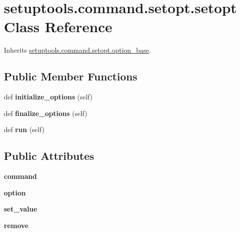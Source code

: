 \hypertarget{classsetuptools_1_1command_1_1setopt_1_1setopt}{}\section{setuptools.\+command.\+setopt.\+setopt Class Reference}
\label{classsetuptools_1_1command_1_1setopt_1_1setopt}


Inherits \hyperlink{classsetuptools_1_1command_1_1setopt_1_1option__base}{setuptools.\+command.\+setopt.\+option\+\_\+base}.

\subsection*{Public Member Functions}
\begin{DoxyCompactItemize}
\item 
\mbox{\label{classsetuptools_1_1command_1_1setopt_1_1setopt_af8e183abb2cbd9fcba068aacc26bc559}} 
def {\bfseries initialize\+\_\+options} (self)
\item 
\mbox{\label{classsetuptools_1_1command_1_1setopt_1_1setopt_acaf07b6c01a56f8c8629dfcfbe8e3872}} 
def {\bfseries finalize\+\_\+options} (self)
\item 
\mbox{\label{classsetuptools_1_1command_1_1setopt_1_1setopt_aa7fb6e59e7688c1d8a93e2fb6bcd3b75}} 
def {\bfseries run} (self)
\end{DoxyCompactItemize}
\subsection*{Public Attributes}
\begin{DoxyCompactItemize}
\item 
\mbox{\label{classsetuptools_1_1command_1_1setopt_1_1setopt_a661e8cc13e8f2ad16bd1786e0557eaf3}} 
{\bfseries command}
\item 
\mbox{\label{classsetuptools_1_1command_1_1setopt_1_1setopt_aaeecee84249dd61d1244d7d0f5fe4b57}} 
{\bfseries option}
\item 
\mbox{\label{classsetuptools_1_1command_1_1setopt_1_1setopt_ae7d35dee0885a7f5eeefd36772e47ed5}} 
{\bfseries set\+\_\+value}
\item 
\mbox{\label{classsetuptools_1_1command_1_1setopt_1_1setopt_ad1ad67d2184093424704a1b6253da442}} 
{\bfseries remove}
\end{DoxyCompactItemize}
